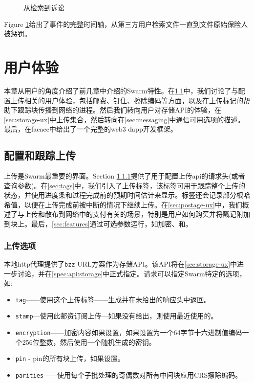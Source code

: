 \begin{figure}[htbp]
  \centering
  \caption[从检索到诉讼]{从检索到诉讼}
  \label{fig:flowchart-retrieval-litigation}
\end{figure}


Figure \ref{fig:flowchart-retrieval-litigation}给出了事件的完整时间轴，从第三方用户检索文件一直到文件原始保险人被惩罚。





\chapter{用户体验}\label{sec:ux}

本章从用户的角度介绍了前几章中介绍的Swarm特性。在\ref{sec:upload}中，我们讨论了与配置上传相关的用户体验，包括邮费、钉住、擦除编码等方面，以及在上传标记的帮助下跟踪块传播到网络的进程。然后我们转向用户对存储API的体验，在\ref{sec:storage-ux}中上传集合，然后转向在\ref{sec:messaging}中通信可用选项的描述。最后，在facace中给出了一个完整的web3 dapp开发框架。

\section{配置和跟踪上传\statusgreen}\label{sec:upload}

\green{}

上传是Swarm最重要的界面。Section \ref{sec:headers}提供了用于配置上传api的请求头(或者查询参数)。在\ref{sec:tags}中，我们引入了上传标签，该标签可用于跟踪整个上传的状态，并使用进度条和过程完成前的预期时间估计来显示。标签还会记录部分根哈希值，以便在上传完成前被中断的情况下继续上传。在\ref{sec:postage-ux}中，我们概述了与上传和散布到网络中的支付有关的场景，特别是用户如何购买并将戳记附加到块上。最后，\ref{sec:features}通过可选参数运行，如加密、和。

\subsection{上传选项\statusgreen}\label{sec:headers}

本地http代理提供了\lstinline{bzz} URL方案作为存储API。该API将在\ref{sec:storage-ux}中进一步讨论，并在\ref{spec:api:storage}中正式指定。请求可以指定Swarm特定的选项，如:

\begin{itemize}
\item \lstinline{tag}——使用这个上传标签——生成并在未给出的响应头中返回。 
\item \lstinline{stamp}—使用此邮资订阅上传—如果没有给出，则使用最近使用的。 
\item \lstinline{encryption}——加密内容如果设置，如果设置为一个64字节十六进制值编码一个256位整数，然后使用一个随机生成的密钥。 
\item \lstinline{pin} - pin的所有块上传，如果设置。 
\item \lstinline{parities}——使用每个子批处理的奇偶数对所有中间块应用CRS擦除编码。
\end{itemize}


